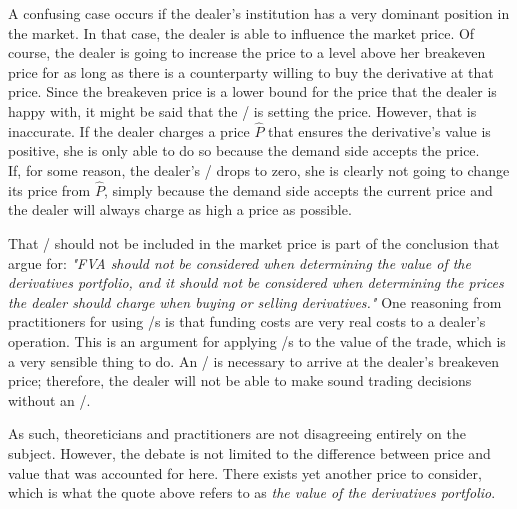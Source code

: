 \documentclass[main.tex]{subfiles}
\begin{document}
    A confusing case occurs if the dealer's institution has a very dominant position in the market.
    In that case, the dealer is able to influence the market price.
    Of course, the dealer is going to increase the price to a level above her breakeven price
    for as long as there is a counterparty willing to buy the derivative at that price.
    Since the breakeven price is a lower bound for the price that the dealer is happy with,
    it might be said that the \FVA/ is setting the price.
    However, that is inaccurate. 
    If the dealer charges a price $\hat{P}$ that ensures the derivative's value is positive,
    she is only able to do so because the demand side accepts the price.
    \\
    If, for some reason, the dealer's \FVA/ drops to zero,
    she is clearly not going to change its price from $\hat{P}$,
    simply because the demand side accepts the current price 
    and the dealer will always charge as high a price as possible.

    That \FVA/ should not be included in the market price 
    is part of the conclusion that \textcite{HullWhite2012FVA} argue for: 
    \textit{%
        "FVA should not be considered when determining the value of the 
        derivatives portfolio, and it should not be considered when determining the prices 
        the dealer should charge when buying or selling derivatives."
    }%
    One reasoning from practitioners for using \FVA/s is 
    that funding costs are very real costs to a dealer's operation.
    This is an argument for applying \FVA/s to the value of the trade,
    which is a very sensible thing to do.
    An \FVA/ is necessary to arrive at the dealer's breakeven price;
    therefore, the dealer will not be able to make sound trading decisions without an \FVA/.
    
    As such, theoreticians and practitioners are not disagreeing entirely on the subject.
    However, the debate is not limited to the difference between price and value
    that was accounted for here. 
    There exists yet another price to consider, which is what the quote above 
    refers to as \textit{the value of the derivatives portfolio}.
\end{document}
